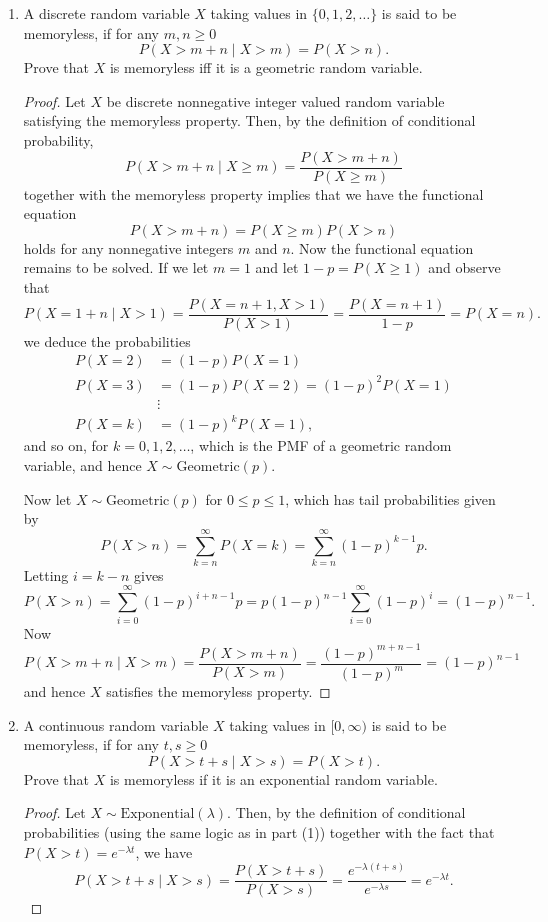 \documentclass[oneside,reqno]{amsart}
\newcommand{\Exp}{\mathrm{Exponential}}
\newcommand{\Geom}{\mathrm{Geometric}}
\theoremstyle{definition}
\begin{document}
\begin{enumerate}
\item
A discrete random variable $X$ taking values in $\{0, 1, 2, \dotsc \}$ is said to be memoryless, if for any $m, n \geq 0$
\[	
	P(X > m + n \mid X > m) = P(X > n).
\]
Prove that $X$ is memoryless iff it is a geometric random variable.
\begin{proof}
Let $X$ be discrete nonnegative integer valued random variable satisfying the memoryless property. Then, by the definition of conditional probability,
\[
	P(X > m + n \mid X \geq m) = \frac{P(X>m + n)}{P(X \geq m)}
\]
together with the memoryless property implies that we have the functional equation
\[
	P(X > m + n) = P(X \geq m)P(X > n)
\] 
holds for any nonnegative integers $m$ and $n$. Now the functional equation remains to be solved. If we let $m=1$ and let $1-p = P(X \geq 1)$ and observe that 
\[
	P(X = 1+n \mid X > 1) =  \frac{P(X  =  n + 1, X > 1)}{P(X > 1)}  = \frac{P(X =n+1)}{1-p}  = P(X = n).
\]
we deduce the probabilities 
\begin{align*}
	P(X=2) &= (1-p) P(X=1) \\
	P(X=3) &= (1-p)P(X=2) = (1-p)^2 P(X=1) \\
	& \vdots \\ 
	P(X=k) &= (1-p)^k P(X=1),
\end{align*}	
and so on, for $k=0,1,2,\dotsc$, which is the PMF of a geometric random variable, and hence $X \sim \Geom(p)$. 
\par
Now let $X \sim \Geom(p)$ for $0 \leq p \leq 1$, which has tail probabilities given by
\[
	P(X > n) = \sum_{k=n}^\infty P(X = k) = \sum_{k=n}^\infty (1 - p)^{k-1} p.
\]
Letting $i=k-n$ gives
\[
	P(X > n) = \sum_{i=0}^\infty (1 - p)^{i+n-1} p = p(1-p)^{n-1} \sum_{i=0}^\infty (1 - p)^i = (1-p)^{n-1}.
\]
Now 
\[
	P(X > m + n \mid X > m)= \frac{P(X>m + n)}{P(X > m)} = \frac{(1-p)^{m+n-1}}{(1-p)^{m}} = (1-p)^{n-1}
\]
and hence $X$ satisfies the memoryless property. 
\end{proof}

\item
A continuous random variable $X$ taking values in $[0, \infty)$ is said to be memoryless, if for any $t,s\geq 0$ 
\[
	P(X > t + s \mid X > s) = P(X > t).
\]
Prove that $X$ is memoryless if it is an exponential random variable. 
\begin{proof}
Let $X \sim \Exp(\lambda)$. Then, by the definition of conditional probabilities (using the same logic as in part (1)) together with the fact that $P(X>t) = e^{-\lambda t}$, we have
\[
	P(X> t+s \mid X > s) =  \frac{P(X > t+s)}{P(X > s)} = \frac{e^{-\lambda(t+s)}}{e^{-\lambda s}} = e^{-\lambda t}.
\]
\end{proof}


\end{enumerate}
\end{document}
